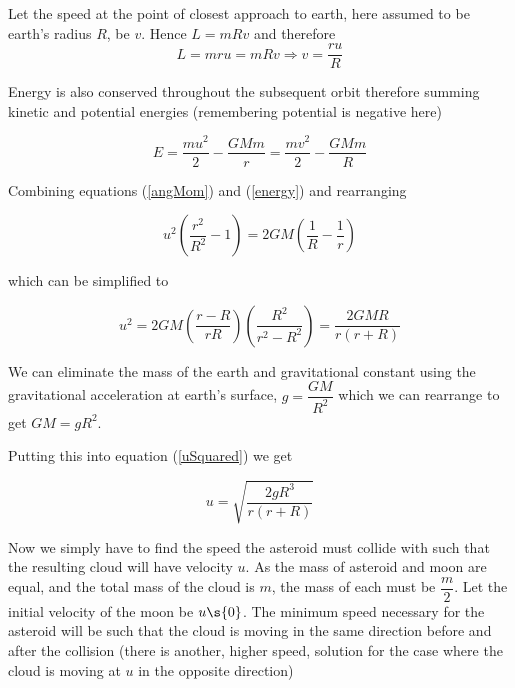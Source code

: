 \begin{problem}
{  Let the speed at the point of closest approach to earth, here assumed to be earth's radius $R$, be $v$. Hence $L = mRv$ and therefore 
  \begin{equation}
  L= mru = mRv \Rightarrow v = \dfrac{ru}{R}
  \label{angMom}
  \end{equation}
  
  Energy is also conserved throughout the subsequent orbit therefore summing kinetic and potential energies (remembering potential is negative here)
  
\begin{equation}
 E = \frac{m u^2}{2} - \frac{GMm}{r} =  \frac{m v^2}{2} - \frac{GMm}{R}
 \label{energy}
 \end{equation}
 
 Combining equations (\ref{angMom}) and (\ref{energy}) and rearranging
 
 \begin{equation*}
 u^2 \left(\frac{r^2}{R^2} - 1\right) = 2GM\left(\frac{1}{R} - \frac{1}{r}\right)
 \end{equation*}
 
 which can be simplified to
 
 \begin{equation}
 u^2 = 2GM \left(\dfrac{r-R}{rR}\right) \left(\dfrac{R^2}{r^2 -R^2}\right) = \dfrac{2GMR}{r(r+R)}
 \label{uSquared}
 \end{equation}
  
  We can eliminate the mass of the earth and gravitational constant using the gravitational acceleration at earth’s surface, $g = \dfrac{GM}{R^2}$ which we can rearrange to get $GM =gR^2$.
  
  Putting this into equation (\ref{uSquared}) we get
  
   \begin{equation*}
 u = \sqrt{\dfrac{2gR^3}{r(r+R)}}
 \end{equation*}
 
 Now we simply have to find the speed the asteroid must collide with such that the resulting cloud will have velocity $u$. As the mass of asteroid and moon are equal, and the total mass of the cloud is $m$, the mass of each must be $\dfrac{m}{2}$. Let the initial velocity of the moon be $u\s{0}$. The minimum speed necessary for the asteroid will be such that the cloud is moving in the same direction before and after the collision (there is another, higher speed, solution for the case where the cloud is moving at $u$ in the opposite direction)
 
}
\end{problem}
